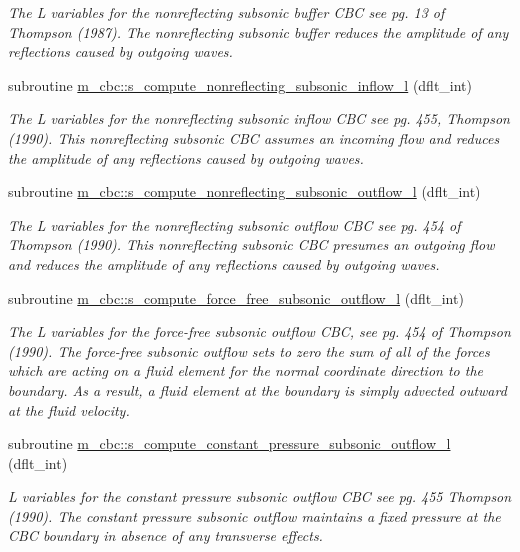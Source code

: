 \begin{DoxyCompactItemize}
\begin{DoxyCompactList}\small\item\em The L variables for the nonreflecting subsonic buffer C\+BC see pg. 13 of Thompson (1987). The nonreflecting subsonic buffer reduces the amplitude of any reflections caused by outgoing waves. \end{DoxyCompactList}\item 
subroutine \hyperlink{namespacem__cbc_aaaa6698b1ae1671a9124bb22617b4b8c}{m\+\_\+cbc\+::s\+\_\+compute\+\_\+nonreflecting\+\_\+subsonic\+\_\+inflow\+\_\+l} (dflt\+\_\+int)
\begin{DoxyCompactList}\small\item\em The L variables for the nonreflecting subsonic inflow C\+BC see pg. 455, Thompson (1990). This nonreflecting subsonic C\+BC assumes an incoming flow and reduces the amplitude of any reflections caused by outgoing waves. \end{DoxyCompactList}\item 
subroutine \hyperlink{namespacem__cbc_af0664437857269683e572ec7b5e3b4b7}{m\+\_\+cbc\+::s\+\_\+compute\+\_\+nonreflecting\+\_\+subsonic\+\_\+outflow\+\_\+l} (dflt\+\_\+int)
\begin{DoxyCompactList}\small\item\em The L variables for the nonreflecting subsonic outflow C\+BC see pg. 454 of Thompson (1990). This nonreflecting subsonic C\+BC presumes an outgoing flow and reduces the amplitude of any reflections caused by outgoing waves. \end{DoxyCompactList}\item 
subroutine \hyperlink{namespacem__cbc_ab95f6f268802b6330f4aef16685ae498}{m\+\_\+cbc\+::s\+\_\+compute\+\_\+force\+\_\+free\+\_\+subsonic\+\_\+outflow\+\_\+l} (dflt\+\_\+int)
\begin{DoxyCompactList}\small\item\em The L variables for the force-\/free subsonic outflow C\+BC, see pg. 454 of Thompson (1990). The force-\/free subsonic outflow sets to zero the sum of all of the forces which are acting on a fluid element for the normal coordinate direction to the boundary. As a result, a fluid element at the boundary is simply advected outward at the fluid velocity. \end{DoxyCompactList}\item 
subroutine \hyperlink{namespacem__cbc_abbe02209311e19efb816f7678a8a9584}{m\+\_\+cbc\+::s\+\_\+compute\+\_\+constant\+\_\+pressure\+\_\+subsonic\+\_\+outflow\+\_\+l} (dflt\+\_\+int)
\begin{DoxyCompactList}\small\item\em L variables for the constant pressure subsonic outflow C\+BC see pg. 455 Thompson (1990). The constant pressure subsonic outflow maintains a fixed pressure at the C\+BC boundary in absence of any transverse effects. \end{DoxyCompactList}\item 

\end{DoxyCompactItemize}
